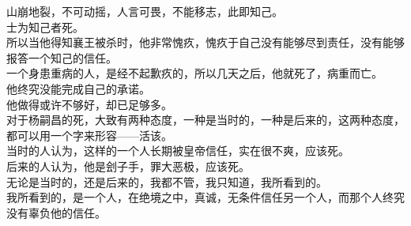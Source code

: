 \begin{multicols}{\theparacolNo}
山崩地裂，不可动摇，人言可畏，不能移志，此即知己。\\

士为知己者死。\\

所以当他得知襄王被杀时，他非常愧疚，愧疚于自己没有能够尽到责任，没有能够报答一个知己的信任。\\

一个身患重病的人，是经不起歉疚的，所以几天之后，他就死了，病重而亡。\\

他终究没能完成自己的承诺。\\

他做得或许不够好，却已足够多。\\

对于杨嗣昌的死，大致有两种态度，一种是当时的，一种是后来的，这两种态度，都可以用一个字来形容——活该。\\

当时的人认为，这样的一个人长期被皇帝信任，实在很不爽，应该死。\\

后来的人认为，他是刽子手，罪大恶极，应该死。\\

无论是当时的，还是后来的，我都不管，我只知道，我所看到的。\\

我所看到的，是一个人，在绝境之中，真诚，无条件信任另一个人，而那个人终究没有辜负他的信任。\\
\ifnum{}
	\end{multicols}
\fi
\newpage
